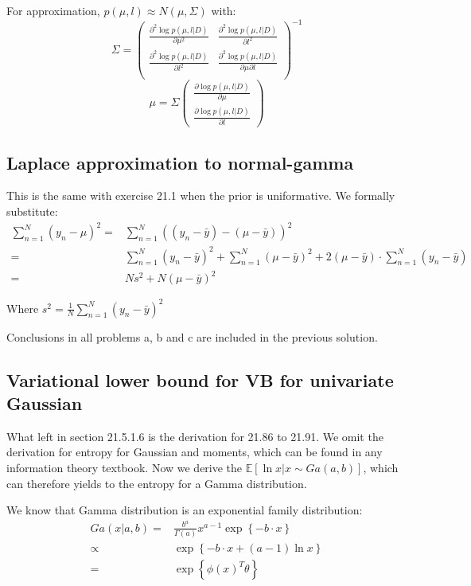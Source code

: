 \documentclass[UTF8]{ctexart}
\begin{document}
For approximation, $p(\mu,l) \approx N(\mu, \Sigma)$ with:
$$\Sigma = \begin{pmatrix} \frac{\partial^{2} \log p(\mu,l|D)}{\partial \mu^{2}} & \frac{\partial^{2} \log p(\mu,l|D)}{\partial l^{2}} \\ \frac{\partial^{2} \log p(\mu,l|D)}{\partial l^{2}} &  \frac{\partial^{2} \log p(\mu,l|D)}{\partial \mu \partial l} \\ \end{pmatrix}^{-1}$$
$$\mu = \Sigma \begin{pmatrix} \frac{\partial \log p(\mu,l|D)}{\partial \mu} \\ \frac{\partial \log p(\mu,l|D)}{\partial l}  \end{pmatrix}$$

\subsection{Laplace approximation to normal-gamma}
This is the same with exercise 21.1 when the prior is uniformative. We formally substitute:
\begin{align}
\sum_{n=1}^{N}(y_{n}-\mu)^{2}=& \sum_{n=1}^{N}((y_{n}-\bar{y})-(\mu-\bar{y}))^{2} \nonumber \\
=&\sum_{n=1}^{N}(y_{n}-\bar{y})^{2} + \sum_{n=1}^{N}(\mu-\bar{y})^{2} + 2(\mu-\bar{y})\cdot\sum_{n=1}^{N}(y_{n}-\bar{y})\nonumber \\
=&Ns^{2}+N(\mu-\bar{y})^{2} \nonumber
\end{align}

Where $s^{2}=\frac{1}{N}\sum_{n=1}^{N}(y_{n}-\bar{y})^{2}$

Conclusions in all problems a, b and c are included in the previous solution.

\subsection{Variational lower bound for VB for univariate Gaussian}
What left in section 21.5.1.6 is the derivation for 21.86 to 21.91. We omit the derivation for entropy for Gaussian and moments, which can be found in any information theory textbook. Now we derive the $\mathbb{E}[\ln x|x \sim Ga(a,b)]$, which can therefore yields to the entropy for a Gamma distribution.

We know that Gamma distribution is an exponential family distribution:
\begin{align}
Ga(x|a,b)=&\frac{b^{a}}{\Gamma(a)}x^{a-1}\exp\left\{-b\cdot x \right\}\nonumber \\
\propto& \exp\left\{-b\cdot x+(a-1) \ln x  \right\} \nonumber\\
=&\exp\left\{ \phi(x)^{T}\theta \right\}\nonumber
\end{align}
\end{document}
